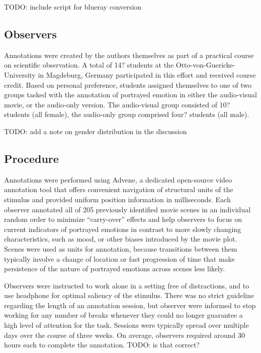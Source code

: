 TODO: include script for blueray conversion

\subsection*{Observers}

Annotations were created by the authors themselves as part of a practical
course on scientific observation. A total of 14? students at the
Otto-von-Guericke-University in Magdeburg, Germany participated in this effort
and received course credit.  Based on personal preference, students assigned
themselves to one of two groups tasked with the annotation of portrayed emotion
in either the audio-visual movie, or the audio-only version. The audio-visual
group consisted of 10?  students (all female), the audio-only group comprised
four? students (all male).

TODO: add a note on gender distribution in the discussion

\subsection*{Procedure}

Annotations were performed using Advene\cite{AP2005}, a dedicated open-source
video annotation tool that offers convenient navigation of structural units of
the stimulus and provided uniform position information in milliseconds.  Each
observer annotated all of 205 previously identified movie scenes in an
individual random order to minimize ``carry-over'' effects and help observers
to focus on current indicators of portrayed emotions in contrast to more slowly
changing characteristics, such as mood, or other biases introduced by the movie
plot. Scenes were used as units for annotation, because transitions between
them typically involve a change of location or fast progression of time that
make persistence of the nature of portrayed emotions across scenes less likely.

Observers were instructed to work alone in a setting free of distractions, and
to use headphone for optimal saliency of the stimulus. There was no strict
guideline regarding the length of an annotation session, but observer were
informed to stop working for any number of breaks whenever they could no longer
guarantee a high level of attention for the task. Sessions were typically
spread over multiple days over the course of three weeks. On average, observers
required around 30 hours each to complete the annotation. TODO: is that correct?

